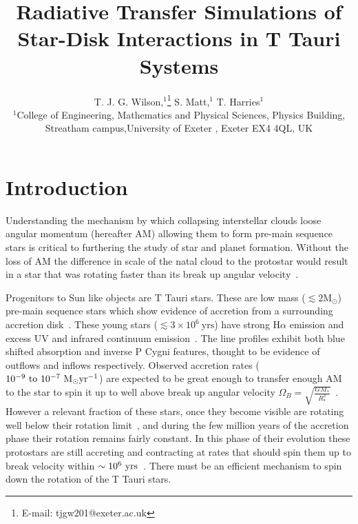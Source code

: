 \documentclass[fleqn,usenatbib]{mnras}
\title[Radiative Transfer of Star-Disk Interactions]{Radiative Transfer Simulations of Star-Disk Interactions in T Tauri Systems}
\author[T. J. G. Wilson et al.]{
T. J. G. Wilson,$^{1}$\thanks{E-mail: tjgw201@exeter.ac.uk}
S. Matt,$^{1}$
T. Harries$^{1}$
\\
$^{1}$College of Engineering, Mathematics and Physical Sciences, Physics Building, Streatham campus,University of Exeter , Exeter EX4 4QL, UK\\
}
\begin{document}
\label{firstpage}
\pagerange{\pageref{firstpage}--\pageref{lastpage}}
\maketitle

\begin{abstract}
\noindent
\end{abstract}



\section{Introduction}
Understanding the mechanism by which collapsing interstellar clouds loose
angular momentum (hereafter AM) allowing them to form pre-main sequence stars
is critical to furthering the study of star and planet formation. Without the
loss of AM the difference in scale of the natal cloud to the protostar would
result in a star that was rotating faster than its break up angular
velocity~\citep{Hartmann:2016gu}. 

Progenitors to Sun like objects are T Tauri stars. These are low mass
($\lesssim 2 \textrm{M}_\odot$) pre-main sequence stars which show evidence of 
accretion from a surrounding accretion disk~\citep{1998ApJ...495..385H}. These
young stars ($\lesssim3\times10^{6}~\textrm{yrs}$) have strong
H$\alpha$ emission and excess UV and infrared continuum
emission~\citep{2005MNRAS.358..671K}.
The line profiles exhibit both blue shifted absorption and inverse P Cygni
features, thought to be evidence of outflows and inflows respectively.
Observed accretion rates ($10^{-9}~\textrm{to}~10^{-7}~{\rm M_{\odot} yr^{-1}}$) are expected to be great enough to transfer enough AM to the star to spin it up to well above break up angular velocity $\Omega_B = \sqrt{\frac{GM_{*}}{R_{*}^3}}$~\citep{2005ApJ...632L.135M}. However a relevant fraction of these stars, once they become visible are rotating well below their rotation limit~\citep{1993A&A...272..176B}, and during the few million years of the accretion phase their rotation remains fairly constant. In this phase of their evolution these protostars are still accreting and contracting at rates that should spin them up to break velocity within $\sim10^{6}~{\rm yrs}$~\citep{2009A&A...508.1117Z}. There must be an efficient mechanism to spin down the rotation of the T Tauri stars. 
\end{document}
